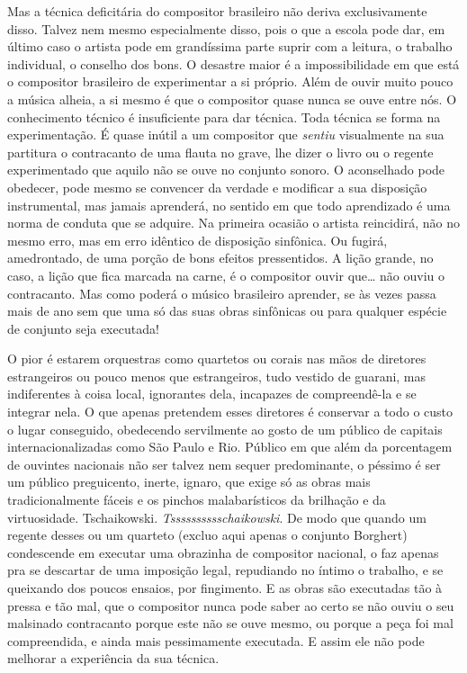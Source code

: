 Mas a técnica deficitária do compositor brasileiro não deriva
exclusivamente disso. Talvez nem mesmo especialmente disso, pois o que a
escola pode dar, em último caso o artista pode em grandíssima parte
suprir com a leitura, o trabalho individual, o conselho dos bons. O
desastre maior é a impossibilidade em que está o compositor brasileiro
de experimentar a si próprio. Além de ouvir muito pouco a música alheia,
a si mesmo é que o compositor quase nunca se ouve entre nós. O
conhecimento técnico é insuficiente para dar técnica. Toda técnica se
forma na experimentação. É quase inútil a um compositor que \textit{sentiu}
visualmente na sua partitura o contracanto de uma flauta no grave, lhe
dizer o livro ou o regente experimentado que aquilo não se ouve no
conjunto sonoro. O aconselhado pode obedecer, pode mesmo se convencer da
verdade e modificar a sua disposição instrumental, mas jamais aprenderá,
no sentido em que todo aprendizado é uma norma de conduta que se
adquire. Na primeira ocasião o artista reincidirá, não no mesmo erro,
mas em erro idêntico de disposição sinfônica. Ou fugirá, amedrontado, de
uma porção de bons efeitos pressentidos. A lição grande, no caso, a
lição que fica marcada na carne, é o compositor ouvir que\ldots{} não ouviu o
contracanto. Mas como poderá o músico brasileiro aprender, se às vezes
passa mais de ano sem que uma só das suas obras sinfônicas ou para
qualquer espécie de conjunto seja executada!

O pior é estarem orquestras como quartetos ou corais nas mãos de
diretores estrangeiros ou pouco menos que estrangeiros, tudo vestido de
guarani, mas indiferentes à coisa local, ignorantes dela, incapazes de
compreendê-la e se integrar nela. O que apenas pretendem esses diretores
é conservar a todo o custo o lugar conseguido, obedecendo servilmente ao
gosto de um público de capitais internacionalizadas como São Paulo e
Rio. Público em que além da porcentagem de ouvintes nacionais não ser
talvez nem sequer predominante, o péssimo é ser um público preguicento,
inerte, ignaro, que exige só as obras mais tradicionalmente fáceis e os
pinchos malabarísticos da brilhação e da virtuosidade. Tschaikowski.
\textit{Tsssssssssschaikowski}. De modo que quando um regente desses ou um
quarteto (excluo aqui apenas o conjunto Borghert) condescende em
executar uma obrazinha de compositor nacional, o faz apenas pra se
descartar de uma imposição legal, repudiando no íntimo o trabalho, e se
queixando dos poucos ensaios, por fingimento. E as obras são executadas
tão à pressa e tão mal, que o compositor nunca pode saber ao certo se
não ouviu o seu malsinado contracanto porque este não se ouve mesmo, ou
porque a peça foi mal compreendida, e ainda mais pessimamente executada.
E assim ele não pode melhorar a experiência da sua técnica.

